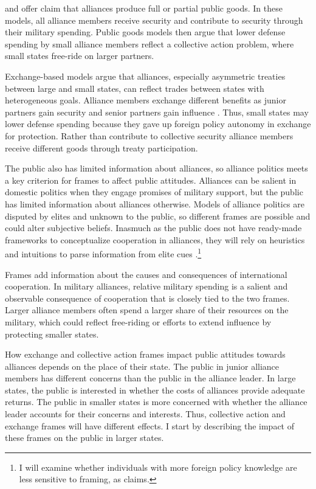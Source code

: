 \documentclass[12pt]{article}
\begin{document}
\citet{OlsonZeckhauser1966} and \citet{SandlerHartley2001} offer claim that alliances produce full or partial public goods.
In these models, all alliance members receive security and contribute to security through their military spending. 
Public goods models then argue that lower defense spending by small alliance members reflect a collective action problem, where small states free-ride on larger partners. 


Exchange-based models argue that alliances, especially asymmetric treaties between large and small states, can reflect trades between states with heterogeneous goals. 
Alliance members exchange different benefits as junior partners gain security and senior partners gain influence \citep{Morrow1991}. 
Thus, small states may lower defense spending because they gave up foreign policy autonomy in exchange for protection.
Rather than contribute to collective security alliance members receive different goods through treaty participation. 


The public also has limited information about alliances, so alliance politics meets a key criterion for frames to affect public attitudes. 
Alliances can be salient in domestic politics when they engage promises of military support, but the public has limited information about alliances otherwise. 
Models of alliance politics are disputed by elites and unknown to the public, so different frames are possible and could alter subjective beliefs.
Inasmuch as the public does not have ready-made frameworks to conceptualize cooperation in alliances, they will rely on heuristics and intuitions to parse information from elite cues \citep{BaumPotter2008}.\footnote{I will examine whether individuals with more foreign policy knowledge are less sensitive to framing, as \citet{Druckman2001} claims.} 


Frames add information about the causes and consequences of international cooperation. 
In military alliances, relative military spending is a salient and observable consequence of cooperation that is closely tied to the two frames. 
Larger alliance members often spend a larger share of their resources on the military, which could reflect free-riding or efforts to extend influence by protecting smaller states. 


How exchange and collective action frames impact public attitudes towards alliances depends on the place of their state. 
The public in junior alliance members has different concerns than the public in the alliance leader. 
In large states, the public is interested in whether the costs of alliances provide adequate returns. 
The public in smaller states is more concerned with whether the alliance leader accounts for their concerns and interests. 
Thus, collective action and exchange frames will have different effects. 
I start by describing the impact of these frames on the public in larger states. 
\end{document}
